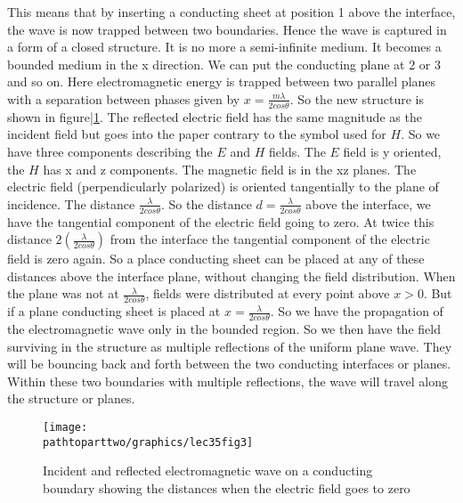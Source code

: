 This means that by inserting a conducting sheet at position 1 above the interface, the wave is now trapped between two boundaries. Hence the wave is captured in a form of a closed structure. It is no more a semi-infinite medium. It becomes a bounded medium in the x direction. We can put the conducting plane at 2 or 3 and so on. Here electromagnetic energy is trapped between two parallel planes with a separation between phases given by $x=\frac{m\lambda}{2cos\theta}$. So the new structure is shown in figure|\ref{fig:lec35fig3}. The reflected electric field has the same magnitude as the incident field but goes into the paper contrary to the symbol used for $H$. So we have three components describing the $E$ and $H$ fields. The $E$ field is y oriented, the $H$ has x and z components. The magnetic field is in the xz planes. The electric field (perpendicularly polarized) is oriented tangentially to the plane of incidence. The distance $\frac{\lambda}{2cos\theta}$. So the distance $d=\frac{\lambda}{2cos\theta}$ above the interface, we have the tangential component of the electric field going to zero. At twice this distance $2\left(\frac{\lambda}{2cos\theta}\right)$ from the interface the tangential component of the electric field is zero again. So a place conducting sheet can be placed at any of these distances above the interface plane, without changing the field distribution. When the plane was not at $\frac{\lambda}{2cos\theta}$, fields were distributed at every point above $x>0$. But if a plane conducting sheet is placed at $x=\frac{\lambda}{2cos\theta}$. So we have the propagation of the electromagnetic wave only in the bounded region. So we then have the field surviving in the structure as multiple reflections of the uniform plane wave. They will be bouncing back and forth between the two conducting interfaces or planes. Within these two boundaries with multiple reflections, the wave will travel along the structure or planes.
\begin{figure}[h]
\centering
\texttt{[image: \\pathtoparttwo/graphics/lec35fig3]}
\caption{Incident and reflected electromagnetic wave on a conducting boundary showing the distances when the electric field goes to zero}
\label{fig:lec35fig3}
\end{figure}

